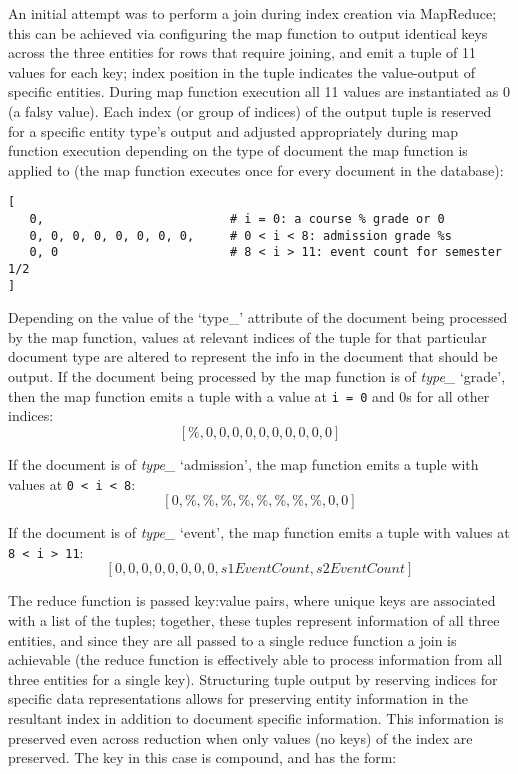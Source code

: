 An initial attempt was to perform a join during index creation via MapReduce; this can be achieved via configuring the map function to output identical keys across the three entities for rows that require joining, and emit a tuple of 11 values for each key; index position in the tuple indicates the value-output of specific entities. During map function execution all 11 values are instantiated as 0 (a falsy value). Each index (or group of indices) of the output tuple is reserved for a specific entity type's output and adjusted appropriately during map function execution depending on the type of document the map function is applied to (the map function executes once for every document in the database):

\begin{verbatim}
[
   0,                          # i = 0: a course % grade or 0
   0, 0, 0, 0, 0, 0, 0, 0,     # 0 < i < 8: admission grade %s
   0, 0                        # 8 < i > 11: event count for semester 1/2
]
\end{verbatim}

Depending on the value of the `type\_' attribute of the document being processed by the map function, values at relevant indices of the tuple for that particular document type are altered to represent the info in the document that should be output. If the document being processed by the map function is of \textit{type\_} ‘grade’, then the map function emits a tuple with a value at \texttt{i = 0} and 0s for all other indices: \[[\%, 0, 0, 0, 0, 0, 0, 0, 0, 0, 0]\]

If the document is of \textit{type\_} `admission', the map function emits a tuple with values at \texttt{0 < i < 8}: \[[0, \%, \%, \%, \%, \%, \%, \%, \%, 0, 0]\]

If the document is of \textit{type\_} ‘event’, the map function emits a tuple with values at \texttt{8 < i > 11}: \[[0, 0, 0, 0, 0, 0, 0, 0, s1EventCount, s2EventCount]\]

The reduce function is passed key:value pairs, where unique keys are associated with a list of the tuples; together, these tuples represent information of all three entities, and since they are all passed to a single reduce function a join is achievable (the reduce function is effectively able to process information from all three entities for a single key). Structuring tuple output by reserving indices for specific data representations allows for preserving entity information in the resultant index in addition to document specific information. This information is preserved even across reduction when only values (no keys) of the index are preserved. The key in this case is compound, and has the form:

